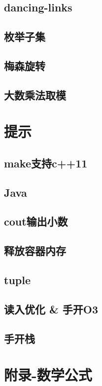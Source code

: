 \documentclass[titlepage,a4paper,10pt]{article}
\begin{document}
\begin{multicols}{2}
\begin{spacing}{0.8}
			\subsection{dancing-links}
				
			\subsection{枚举子集}
				
			\subsection{梅森旋转}
				
			\subsection{大数乘法取模}
				
		\section{提示}
			\subsection{make支持c++11}
				
			\subsection{Java}
				
			\subsection{cout输出小数}
				
			\subsection{释放容器内存}
				
			\subsection{tuple}
				
			\subsection{读入优化 \& 手开O3}
				
			\subsection{手开栈}
				
		\section{附录-数学公式}
			
			
		\end{spacing}
		\endgroup
	\end{multicols}
\end{document}
